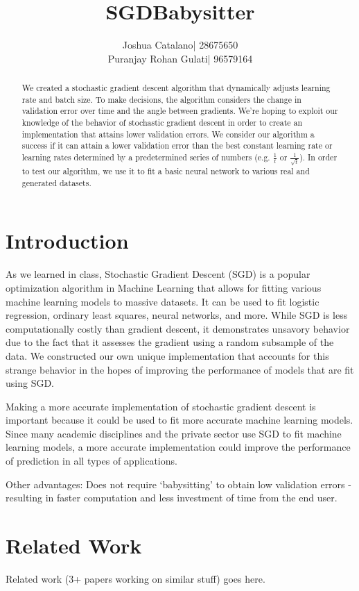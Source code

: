 \documentclass{article}
\title{SGDBabysitter}
\author{
	\begin{tabular}{rl}
			Joshua Catalano &|  28675650 \\
		Puranjay Rohan Gulati &|  96579164
	\end{tabular}
}
\begin{document}
 
 \maketitle 
 
 \begin{abstract} 
 	We created a stochastic gradient descent algorithm that dynamically adjusts learning rate and batch size. To make decisions, the algorithm considers the change in validation error over time and the angle between gradients. We're hoping to exploit our knowledge of the behavior of stochastic gradient descent in order to create an implementation that attains lower validation errors. We consider our algorithm a success if it can attain a lower validation error than the best constant learning rate or learning rates determined by a predetermined series of numbers (e.g. $\frac{1}{t}$ or $\frac{1}{\sqrt{t}}$). In order to test our algorithm, we use it to fit a basic neural network to various real and generated datasets. 
\end{abstract} 

\section*{Introduction} As we learned in class, Stochastic Gradient Descent (SGD) is a popular optimization algorithm in Machine Learning that allows for fitting various machine learning models to massive datasets. It can be used to fit logistic regression, ordinary least squares, neural networks, and more. While SGD is less computationally costly than gradient descent, it demonstrates unsavory behavior due to the fact that it assesses the gradient using a random subsample of the data. We constructed our own unique implementation that accounts for this strange behavior in the hopes of improving the performance of models that are fit using SGD. 
\par Making a more accurate implementation of stochastic gradient descent is important because it could be used to fit more accurate machine learning models. Since many academic disciplines and the private sector use SGD to fit machine learning models, a more accurate implementation could improve the performance of prediction in all types of applications. 
\par Other advantages: Does not require `babysitting' to obtain low validation errors - resulting in faster computation and less investment of time from the end user. 

\section*{Related Work}
Related work (3+ papers working on similar stuff) goes here.
\end{document}
